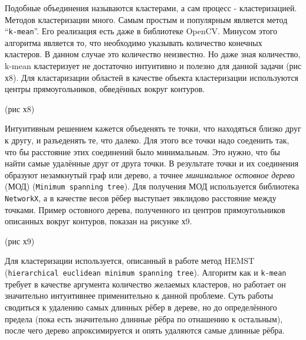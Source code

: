 \documentclass[12pt]{report}
\begin{document}
Подобные объединения называются кластерами, а сам процесс - кластеризацией. Методов кластеризации много. Самым простым и популярным является метод ``\texttt{k-mean}''. Его реализация есть даже в библиотеке OpenCV. Минусом этого алгоритма является то, что необходимо указывать количество конечных кластеров. В данном случае это количество неизвестно. Но даже зная количество, k-mean кластеризует не достаточно интуитивно и полезно для данной задачи (рис х8). Для кластаризации областей в качестве объекта кластеризации используются центры прямоугольников, обведённых вокруг контуров.

(рис х8)

Интуитивным решением кажется объеденять те точки, что находяться близко друг к другу, и разъеденять те, что далеко. Для этого все точки надо соеденить так, что бы   расстояние этих соединений было минимальным. Это нужно, что бы найти самые удалённые друг от друга точки. В результате точки и их соединения образуют незамкнутый граф или дерево, а точнее \emph{минимальное остовное дерево}  (МОД) (\texttt{Minimum spanning tree}). Для получения МОД используется библиотека \texttt{NetworkX}, а в качестве весов рёбер выступает эвклидово расстояние между точками. Пример остовного дерева, полученного из центров прямоугольников описанных вокруг контуров, показан на рисунке х9.

(рис х9)

Для кластеризации используется, описанный в работе \citep{grygorash2006minimum} метод HEMST (\texttt{hierarchical euclidean minimum spanning tree}). Алгоритм как и \texttt{k-mean} требует в качестве аргумента количество желаемых кластеров, но работает он значительно интуитивнее применительно к данной проблеме. Суть работы сводиться к удалению самых длинных рёбер в дереве, но до определённого предела (пока есть значительно длинные рёбра по отнашению к остальным), после чего дерево апроксимируется и опять удаляются самые длинные рёбра.
\end{document}
